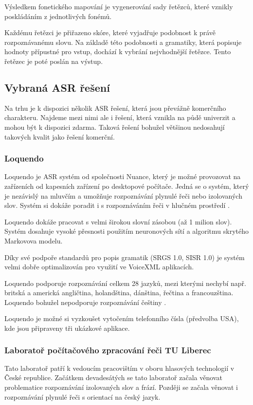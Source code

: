 \documentclass[ing,male,java,dept460]{diploma}						%
\begin{document}
Výsledkem fonetického mapování je vygenerování sady řetězců, které vznikly poskládáním z jednotlivých fonémů.

Každému řetězci je přiřazeno skóre, které vyjadřuje podobnost k právě rozpoznávanému slovu. Na základě této podobnosti a gramatiky, která popisuje hodnoty přípustné pro vstup, dochází k vybrání nejvhodnější řetězce. Tento řetězec je poté poslán na výstup.

\subsection{Vybraná ASR řešení}
Na trhu je k dispozici několik ASR řešení, která jsou převážně komerčního charakteru. Najdeme mezi nimi ale i řešení, která vznikla na půdě univerzit a mohou být k dispozici zdarma. Taková řešení bohužel většinou nedosahují takových kvalit jako řešení komerční.

\subsubsection{Loquendo}
Loquendo je ASR systém od společnosti Nuance, který je možné provozovat na zařízeních od kapesních zařízení po desktopové počítače. Jedná se o systém, který je nezávislý na mluvčím a umožňuje rozpoznávání plynulé řeči nebo izolovaných slov. Systém si dokáže poradit i s rozpoznáváním řeči v hlučném prostředí \cite{loquendo}.

Loquendo dokáže pracovat s velmi širokou slovní zásobou (až 1 milion slov). Systém dosahuje vysoké přesnosti použitím neuronových sítí a algoritmu skrytého Markovova modelu.

Díky své podpoře standardů pro popis gramatik (SRGS 1.0, SISR 1.0) je systém velmi dobře optimalizován pro využití ve VoiceXML aplikacích.

Loquendo podporuje rozpoznávání celkem 28 jazyků, mezi kterými nechybí např. britská a americká angličtina, holandština, dánština, řečtina a francouzština. Loquendo bohužel nepodporuje rozpoznávání češtiny \cite{nuance_com}.

Loquendo je možné si vyzkoušet vytočením telefonního čísla (předvolba USA), kde jsou připraveny tři ukázkové aplikace.

\subsubsection{Laboratoř počítačového zpracování řeči TU Liberec}
Tato laboratoř patří k vedoucím pracovištím v oboru hlasových technologií v České republice. Začátkem devadesátých se tato laboratoř začala věnovat problematice rozpoznávání izolovaných slov a frází. Později se začala věnovat i rozpoznávání plynulé řeči s orientací na český jazyk.
\end{document}
